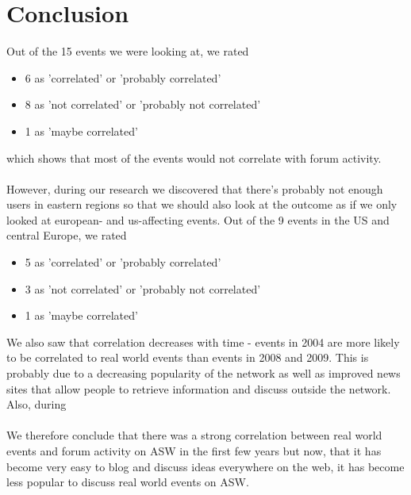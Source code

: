 \documentclass[11pt,a4paper,english]{article}
\begin{document}
	\section{Conclusion}
		Out of the 15 events we were looking at, we rated
		\begin{itemize}
			\item 6 as 'correlated' or 'probably correlated'
			\item 8 as 'not correlated' or 'probably not correlated'
			\item 1 as 'maybe correlated'
		\end{itemize}
		which shows that most of the events would not correlate with forum activity.
		\\\\However, during our research we discovered that there's probably not enough users in eastern regions so that we should also look at the outcome as if we only looked at european- and us-affecting events. Out of the 9 events in the US and central Europe, we rated 
		\begin{itemize}
			\item 5 as 'correlated' or 'probably correlated'
			\item 3 as 'not correlated' or 'probably not correlated'
			\item 1 as 'maybe correlated'
		\end{itemize}
		We also saw that correlation decreases with time - events in 2004 are more likely to be correlated to real world events than events in 2008 and 2009. This is probably due to a decreasing popularity of the network as well as improved news sites that allow people to retrieve information and discuss outside the network. Also, during 
	\\\\We therefore conclude that there was a strong correlation between real world events and forum activity on ASW in the first few years but now, that it has become very easy to blog and discuss ideas everywhere on the web, it has become less popular to discuss real world events on ASW.
		
\end{document}
